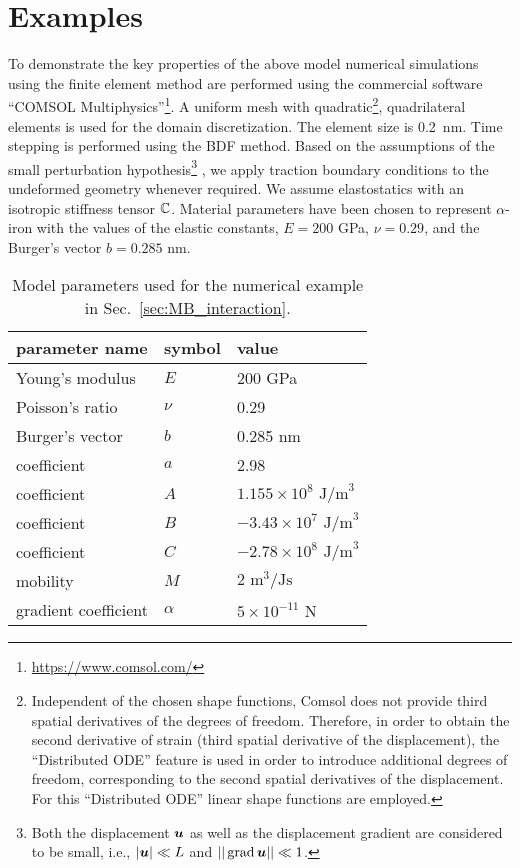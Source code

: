 \documentclass[preprint,review,3p,times,authoryear]{elsarticle}
\begin{document}
\section{Examples}
\label{sec:examples}
To demonstrate the key properties of the above model numerical simulations using the finite element method are performed using the commercial software ``COMSOL Multiphysics''\footnote{\url{https://www.comsol.com/}}. A uniform mesh with quadratic\footnote{Independent of the chosen shape functions, Comsol does not provide third spatial derivatives of the degrees of freedom. Therefore, in order to obtain the second derivative of strain (third spatial derivative of the displacement), the ``Distributed ODE'' feature is used in order to introduce additional degrees of freedom, corresponding to the second spatial derivatives of the displacement. For this ``Distributed ODE'' linear shape functions are employed.}, quadrilateral elements is used for the domain discretization. The element size is 0.2~nm. Time stepping is performed using the BDF method.
Based on the assumptions of the small perturbation hypothesis\footnote{Both the displacement $\boldsymbol{u}$ as well as the displacement gradient are considered to be small, i.e., $|\boldsymbol{u}|\ll L$ and $||\operatorname*{grad}{\boldsymbol{u}}||\ll 1$.} \citep{Maugin:1992uq}, we apply traction boundary conditions to the undeformed geometry whenever required.
We assume elastostatics with an isotropic stiffness tensor $\boldsymbol{\mathbb{C}}$. Material parameters have been chosen to represent $\alpha$-iron with the values of the elastic constants, $E=200$ GPa, $\nu=0.29$, and the Burger's vector $b=0.285$ nm.
\begin{table}[tbp]
  \begin{tabular}{lll}
    \hline
    parameter name & symbol & value\\
    \hline
    Young's modulus & $E$ & 200 GPa \\
    Poisson's ratio & $\nu$ & 0.29 \\
    Burger's vector & $b$ & 0.285 nm\\
    \hline
    coefficient & $a$ & 2.98 \\
    coefficient & $A$ & $1.155\times 10^{8} \text{ J/m}^{3}$\\
    coefficient & $B$ & $-3.43\times 10^{7} \text{ J/m}^{3}$\\
    coefficient & $C$ & $-2.78\times 10^{8} \text{ J/m}^{3}$\\
    mobility & $M$ & $2 \text{ m}^{3}/\text{Js}$\\
    gradient coefficient & $\alpha$ & $5\times 10^{-11} \text{ N}$
  \end{tabular}
  \caption{Model parameters used for the numerical example in Sec.~\ref{sec:MB_interaction}.}
  \label{tab:pars}
\end{table}
\end{document}
